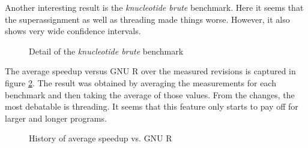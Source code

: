 Another interesting result is the \emph{knucleotide brute} benchmark. Here it seems that the superassignment as well as threading made things worse. However, it also shows very wide confidence intervals.

\begin{figure}[htbp]
  \caption{\label{fig:knucleotide}Detail of the \emph{knucleotide brute} benchmark}
  \centering
\end{figure}

The average speedup versus GNU R over the measured revisions is captured in figure \ref{fig:avg-speedup-history}. The result was obtained by averaging the measurements for each benchmark and then taking the average of those values. From the changes, the most debatable is threading. It seems that this feature only starts to pay off for larger and longer programs.

\begin{figure}[htbp]
  \caption{\label{fig:avg-speedup-history}History of average speedup vs. GNU R}
  \centering
\end{figure}
